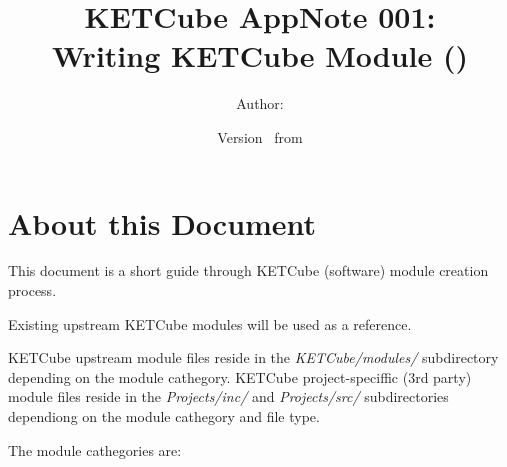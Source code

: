   




\title{\UWBLogo KETCube AppNote 001:\\ Writing KETCube Module (\vhCurrentVersion)}

\author{Author: \vhListAllAuthorsLongWithAbbrev}
\date{Version \vhCurrentVersion\ from \vhCurrentDate}

  




  


\section*{About this Document}


This document is a short guide through KETCube (software) module creation process. 

Existing upstream KETCube modules will be used as a reference.

KETCube upstream module files reside in the {\it KETCube/modules/} subdirectory depending on the module cathegory.
KETCube project-speciffic (3rd party) module files reside in the {\it Projects/inc/} and {\it Projects/src/} subdirectories dependiong on the module cathegory and file type.

The module cathegories are:


